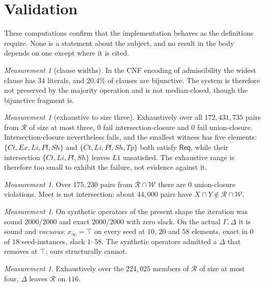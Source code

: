 \documentclass[11pt,reqno]{amsart}
\theoremstyle{plain}
\theoremstyle{definition}
\theoremstyle{remark}
\newtheorem{measurement}[theorem]{Measurement}
\newcommand{\Law}{\mathsf{Req}}
\begin{document}
\appendix

\section{Validation}\label{sec:validation}

These computations confirm that the implementation behaves as the
definitions require. None is a statement about the subject, and no result
in the body depends on one except where it is cited.

\begin{measurement}[clause widths]\label{meas:arity}
In the CNF encoding of admissibility the widest clause has $34$ literals, and
$20.4\%$ of clauses are bijunctive. The system is therefore not preserved by the
majority operation and is not median-closed, though the bijunctive fragment is.
\end{measurement}

\begin{measurement}[exhaustive to size three]\label{meas:closureprops}
Exhaustively over all $172{,}431{,}735$ pairs from $\mathcal{R}$ of size at
most three, $0$ fail intersection-closure and $0$ fail union-closure.
Intersection-closure nevertheless fails, and the smallest witness has five
elements: $\{Ct,Ex,Li,Pl,Sh\}$ and $\{Ct,Li,Pl,Sh,Tp\}$ both satisfy $\Law$,
while their intersection $\{Ct,Li,Pl,Sh\}$ leaves $L1$ unsatisfied. The
exhaustive range is therefore too small to exhibit the failure, not evidence
against it.
\end{measurement}

\begin{measurement}\label{meas:latticeconf}
Over $175{,}230$ pairs from $\mathcal{R} \cap \mathcal{W}$ there are $0$
union-closure violations. Meet is not intersection: about $44{,}000$ pairs have
$X \cap Y \notin \mathcal{R} \cap \mathcal{W}$.
\end{measurement}

\begin{measurement}\label{meas:vacuous}
On synthetic operators of the present shape the iteration was sound $2000/2000$
and exact $2000/2000$ with zero slack. On the actual $\Gamma,\Delta$ it is sound
and \emph{vacuous}: $x_\infty = \top$ on every seed at $10$, $20$ and $58$
elements, exact in $0$ of $18$ seed-instances, slack $1$--$58$. The synthetic
operators admitted a $\Delta$ that removes at $\top$; ours structurally cannot.
\end{measurement}

\begin{measurement}\label{meas:noinvariance}
Exhaustively over the $224{,}025$ members of $\mathcal{R}$ of size at most four,
$\Delta$ leaves $\mathcal{R}$ on $116$.
\end{measurement}
\end{document}
